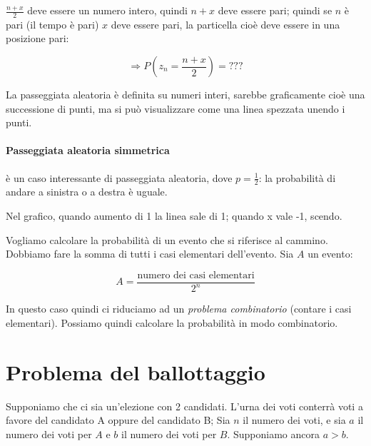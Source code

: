 \documentclass[a4paper,12pt]{book}
\newcommand\ddfrac[2]{\frac{\displaystyle #1}{\displaystyle #2}}
\begin{document}
$\ddfrac{n+x}{2}$ deve essere un numero intero, quindi $ n+x $ deve essere pari; quindi se $ n $ è pari (il tempo è pari) $ x $ deve essere pari, la particella cioè deve essere in una posizione pari:

$$\Rightarrow P(z_n = \frac{n+x}{2}) = ???$$

La passeggiata aleatoria è definita su numeri interi, sarebbe graficamente cioè una successione di punti, ma si può visualizzare come una linea spezzata unendo i punti. 

\paragraph{Passeggiata aleatoria simmetrica} è un caso interessante di passeggiata aleatoria, dove $ p = \frac{1}{2} $: la probabilità di andare a sinistra o a destra è uguale. 

Nel grafico, quando aumento di 1 la linea sale di 1; quando x vale -1, scendo. 


Vogliamo calcolare la probabilità di un evento che si riferisce al cammino. Dobbiamo fare la somma di tutti i casi elementari dell'evento. Sia $ A $ un evento:

$$A = \frac{\text{numero dei casi elementari}}{2^n}$$

In questo caso quindi ci riduciamo ad un \textit{problema combinatorio} (contare i casi elementari). Possiamo quindi calcolare la probabilità in modo combinatorio. 

\section{Problema del ballottaggio}
Supponiamo che ci sia un'elezione con 2 candidati. L'urna dei voti conterrà voti a favore del candidato A oppure del candidato B; Sia $ n $ il numero dei voti, e sia $ a $ il numero dei voti per $ A $ e $ b $ il numero dei voti per $ B $.  Supponiamo ancora $ a > b $. 
\end{document}
